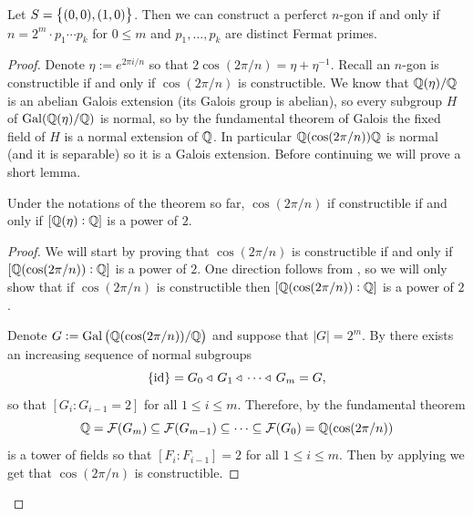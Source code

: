 \documentclass[11pt,a4paper]{article}
\begin{document}
\begin{theorem}
  Let $S = \left\{(0,0),(1,0)\right\}$.
  Then we can construct a perferct $n$-gon
  if and only if $n = 2^m \cdot p_1 \cdots p_k$
  for $0 \le m$ and $p_1,\dots,p_k$ are distinct Fermat primes.
\end{theorem}
\begin{proof}
  Denote $\eta := e^{2 \pi i/n}$ so that $2\cos(2\pi/n) = \eta + \eta^{-1}$.
  Recall
  an $n$-gon is constructible if and only if $\cos(2\pi/n)$
  is constructible.
  We know that $\mathbb{Q}(\eta)/\mathbb{Q}$ is an abelian Galois extension
  (its Galois group is abelian),
  so every subgroup $H$ of $\operatorname{Gal}(\mathbb{Q}(\eta)/\mathbb{Q})$
  is normal, so by the fundamental theorem of Galois
  the fixed field of $H$ is a normal extension of $\mathbb{Q}$.
  In particular $\mathbb{Q}(\cos(2\pi/ n))\mathbb{Q}$ is normal (and it is separable)
  so it is a Galois extension.
  Before continuing we will prove a short lemma.

  \begin{lemma}
    Under the notations of the theorem so far,
    $\cos(2\pi / n)$ if constructible if and only if
    $[\mathbb{Q}(\eta) : \mathbb{Q}]$ is a power of $2$.
  \end{lemma}
  \begin{proof}
  We will start by proving that
  $\cos(2\pi / n)$ is constructible if and only if
  $[\mathbb{Q}(\cos(2\pi/n)) : \mathbb{Q}]$ is a power of $2$.
  One direction follows
  from ,
  so we will only show that if $\cos(2\pi / n)$ is constructible then
  $[\mathbb{Q}(\cos(2\pi/n)) : \mathbb{Q}]$ is a power of $2$.

  Denote $G := \Gal\del{\Q(\cos(2\pi/n))/\Q}$
  and suppose that $|G| = 2^m$.
  By 
  there exists an increasing sequence of normal subgroups
  \[
    \left\{\operatorname{id}\right\} = G_0 \triangleleft\, G_1 \triangleleft\, \cdots \triangleleft\, G_m = G,
  \]
  so that $[G_i : G_{i-1} = 2]$ for all $1 \le i \le m$.
  Therefore, by the fundamental theorem
  \[
    \mathbb{Q} = \mathcal F(G_m) \subseteq \mathcal F(G_{m-1}) \subseteq \cdots
    \subseteq \mathcal F(G_0) = \mathbb{Q}(\cos(2\pi/n))
  \]
  is a tower of fields so that $[F_{i} : F_{i-1}] = 2$
  for all $1 \le i \le m$.
  Then by applying 
  we get that $\cos(2\pi/n)$ is constructible.


\end{proof}
\end{proof}
\end{document}
